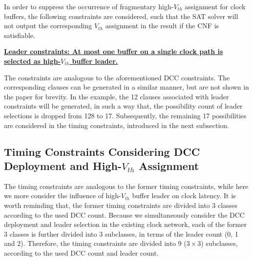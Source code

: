 In order to suppress the occurrence of fragmentary high-$V_{th}$ assignment for clock buffers, the following constraints are considered, such that the SAT solver will not output the corresponding $V_{th}$ assignment in the result if the CNF is satisfiable.

\noindent \textbf{\uline{Leader constraints: At most one buffer on a single clock path is selected as high-$V_{th}$ buffer leader.}}

The constraints are analogous to the aforementioned DCC constraints. The corresponding clauses can be generated in a similar manner, but are not shown in the paper for brevity. In the example, the 12 clauses associated with leader constraints will be generated, in such a way that, the possibility count of leader selections is dropped from 128 to 17. Subsequently, the remaining 17 possibilities are considered in the timing constraints, introduced in the next subsection.

\subsection{Timing Constraints Considering DCC Deployment and High-$V_{th}$ Assignment}
\label{sec:VTA:timing}
The timing constraints are analogous to the former timing constraints, while here we more consider the influence of high-$V_{th}$ buffer leader on clock latency. It is worth reminding that, the former timing constraints are divided into 3 classes according to the used DCC count. Because we simultaneously consider the DCC deployment and leader selection in the existing clock network, each of the former 3 classes is further divided into 3 subclasses, in terms of the leader count (0, 1 and 2). Therefore, the timing constraints are divided into 9 ($3 \times 3$) subclasses, according to the used DCC count and leader count.

